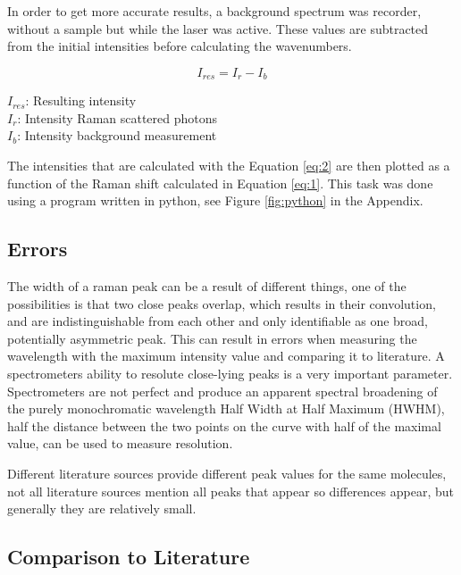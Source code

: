     In order to get more accurate results, a background spectrum was recorder, without a sample but while the laser was active. These values are subtracted from the initial intensities before calculating the wavenumbers. 

    \begin{equation} \label{eq:2}
        I_{res}=I_r-I_b
    \end{equation}

    \( I_{res}\): Resulting intensity\\
    \(I_r\): Intensity Raman scattered photons\\
    \(I_b\): Intensity background measurement

    \bigskip

    The intensities that are calculated with the Equation \ref{eq:2} are then plotted as a function of the Raman shift calculated in Equation \ref{eq:1}. This task was done using a program written in python, see Figure \ref{fig:python} in the Appendix.

\subsection{Errors}
The width of a raman peak can be a result of different things, one of the possibilities is that two close peaks overlap, which results in their convolution, and are indistinguishable from each other and only identifiable as one broad, potentially asymmetric peak. This can result in errors when measuring the wavelength with the maximum intensity value and comparing it to literature. A spectrometers ability to resolute close-lying peaks is a very important parameter. Spectrometers are not perfect and produce an apparent spectral broadening of the purely monochromatic wavelength Half Width at Half Maximum (HWHM), half the distance between the two points on the curve with half of the maximal value, can be used to measure resolution.

\bigskip

Different literature sources provide different peak values for the same molecules, not all literature sources mention all peaks that appear so differences appear, but generally they are relatively small. 

\newpage


\subsection{Comparison to Literature}

